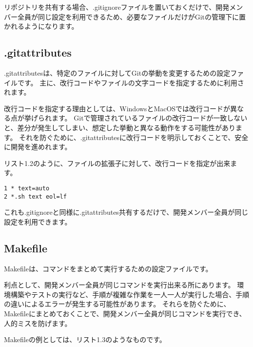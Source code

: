 リポジトリを共有する場合、.gitignoreファイルを置いておくだけで、開発メンバー全員が同じ設定を利用できるため、必要なファイルだけがGitの管理下に置かれるようになります。

\subsection{.gitattributes}

.gitattributesは、特定のファイルに対してGitの挙動を変更するための設定ファイルです。
主に、改行コードやファイルの文字コードを指定するために利用されます。

改行コードを指定する理由としては、WindowsとMacOSでは改行コードが異なる点が挙げられます。
Gitで管理されているファイルの改行コードが一致しないと、差分が発生してしまい、想定した挙動と異なる動作をする可能性があります。
それを防ぐために、.gitattributesに改行コードを明示しておくことで、安全に開発を進めれます。

リスト1.2のように、ファイルの拡張子に対して、改行コードを指定が出来ます。

\begin{tcolorbox}[title=リスト1.2 .gitattributes]
  \begin{verbatim}
1 * text=auto
2 *.sh text eol=lf
\end{verbatim}
\end{tcolorbox}

これも.gitignoreと同様に.gitattributes共有するだけで、開発メンバー全員が同じ設定を利用できます。


\subsection{Makefile}

Makefileは、コマンドをまとめて実行するための設定ファイルです。

利点として、開発メンバー全員が同じコマンドを実行出来る所にあります。
環境構築やテストの実行など、手順が複雑な作業を一人一人が実行した場合、手順の違いによるエラーが発生する可能性があります。
それらを防ぐために、Makefileにまとめておくことで、開発メンバー全員が同じコマンドを実行でき、人的ミスを防げます。

Makefileの例としては、リスト1.3のようなものです。

